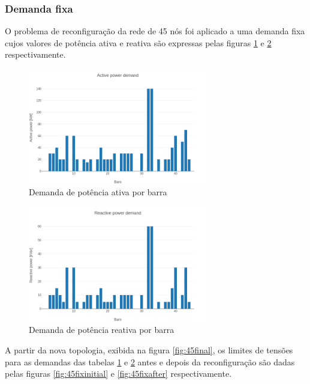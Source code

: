 \subsubsection{Demanda fixa}

O problema de reconfiguração da rede de 45 nós foi aplicado a uma demanda fixa cujos valores de potência ativa e reativa são expressas pelas figuras \ref{fig:45fixactive} e \ref{fig:45fixreactive} respectivamente.

\begin{figure}[H]
    \centering
    \includegraphics[width=0.7\textwidth]{7_Results/img/45fixdemand_active.png}
    \caption{Demanda de potência ativa por barra}
    \label{fig:45fixactive}
\end{figure}

\begin{figure}[H]
    \centering
    \includegraphics[width=0.7\textwidth]{7_Results/img/45fixdemand_reactive.png}
    \caption{Demanda de potência reativa por barra}
    \label{fig:45fixreactive}
\end{figure}

A partir da nova topologia, exibida na figura \ref{fig:45final}, os limites de tensões para as demandas das tabelas \ref{fig:45fixactive} e \ref{fig:45fixreactive} antes e depois da reconfiguração são dadas pelas figuras \ref{fig:45fixinitial} e \ref{fig:45fixafter} respectivamente.

